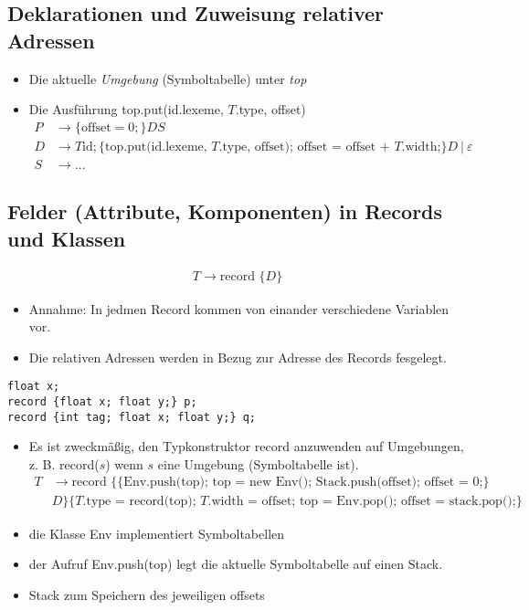 \subsection{Deklarationen und Zuweisung relativer Adressen}
\begin{itemize}
 \item Die aktuelle \emph{Umgebung} (Symboltabelle) unter \emph{top}
 \item Die Ausführung top.put(id.lexeme, $T$.type, offset)
     \begin{align*}
      P &\to \{\text{offset} = 0;\}DS \\
      D &\to T \text{id}; \{\text{top.put(id.lexeme, $T$.type, offset); offset = offset + $T$.width;}\}D\ |\ \varepsilon \\
      S &\to ...
     \end{align*}
\end{itemize}

\subsection{Felder (Attribute, Komponenten) in Records und Klassen}
\begin{align*}
    T \to \text{record\ \{}D\text{\}}
\end{align*}
\begin{itemize}
\item Annahme: In jedmen Record kommen von einander verschiedene Variablen vor.
\item Die relativen Adressen werden in Bezug zur Adresse des Records fesgelegt.
\end{itemize}
\Bsp
\begin{verbatim}
float x;
record {float x; float y;} p;
record {int tag; float x; float y;} q;
\end{verbatim}
\begin{itemize}
 \item Es ist zweckmäßig, den Typkonstruktor record anzuwenden auf Umgebungen, z. B. record($s$) wenn $s$ eine Umgebung (Symboltabelle ist).
 \begin{align*}
  T &\to \text{record\ \{} \{\text{Env.push(top); top = new Env(); Stack.push(offset); offset = 0;}\} \\
  &D \text{\} \{$T$.type = record(top); $T$.width = offset; top = Env.pop(); offset = stack.pop();\}} 
 \end{align*}
 \item die Klasse Env implementiert Symboltabellen
 \item der Aufruf Env.push(top) legt die aktuelle Symboltabelle auf einen Stack.
 \item Stack zum Speichern des jeweiligen offsets
\end{itemize}

